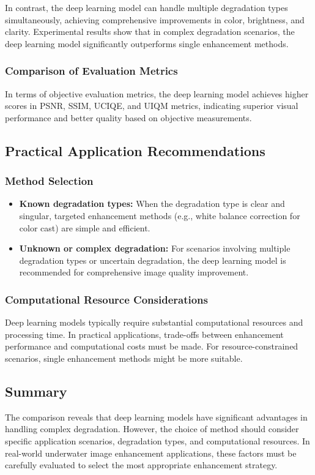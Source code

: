 \documentclass{apmcmthesis}
\begin{document}
In contrast, the deep learning model can handle multiple degradation types simultaneously, achieving comprehensive improvements in color, brightness, and clarity. Experimental results show that in complex degradation scenarios, the deep learning model significantly outperforms single enhancement methods.

\subsubsection{Comparison of Evaluation Metrics}
In terms of objective evaluation metrics, the deep learning model achieves higher scores in PSNR, SSIM, UCIQE, and UIQM metrics, indicating superior visual performance and better quality based on objective measurements.

\subsection{Practical Application Recommendations}
\subsubsection{Method Selection}
\begin{itemize}
    \item \textbf{Known degradation types:} When the degradation type is clear and singular, targeted enhancement methods (e.g., white balance correction for color cast) are simple and efficient.
    \item \textbf{Unknown or complex degradation:} For scenarios involving multiple degradation types or uncertain degradation, the deep learning model is recommended for comprehensive image quality improvement.
\end{itemize}

\subsubsection{Computational Resource Considerations}
Deep learning models typically require substantial computational resources and processing time. In practical applications, trade-offs between enhancement performance and computational costs must be made. For resource-constrained scenarios, single enhancement methods might be more suitable.

\subsection{Summary}
The comparison reveals that deep learning models have significant advantages in handling complex degradation. However, the choice of method should consider specific application scenarios, degradation types, and computational resources. In real-world underwater image enhancement applications, these factors must be carefully evaluated to select the most appropriate enhancement strategy.
\end{document}
